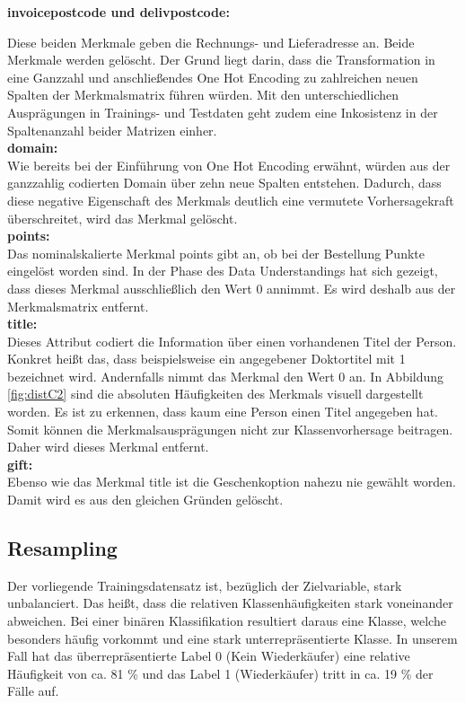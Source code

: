 \textbf{invoicepostcode und delivpostcode:}

Diese beiden Merkmale geben die Rechnungs- und Lieferadresse an. Beide Merkmale werden gelöscht. Der Grund liegt darin, dass die Transformation in eine Ganzzahl und anschließendes One Hot Encoding zu zahlreichen neuen Spalten der Merkmalsmatrix führen würden. Mit den unterschiedlichen Ausprägungen in Trainings- und Testdaten geht zudem eine Inkosistenz in der Spaltenanzahl beider Matrizen einher. \\

\textbf{domain:}\\

Wie bereits bei der Einführung von One Hot Encoding erwähnt, würden aus der ganzzahlig codierten Domain über zehn neue Spalten entstehen. Dadurch, dass diese negative Eigenschaft des Merkmals deutlich eine vermutete Vorhersagekraft überschreitet, wird das Merkmal gelöscht.\\

\textbf{points:}\\

Das nominalskalierte Merkmal points gibt an, ob bei der Bestellung Punkte eingelöst worden sind. In der Phase des Data Understandings hat sich gezeigt, dass dieses Merkmal ausschließlich den Wert 0 annimmt. Es wird deshalb aus der Merkmalsmatrix entfernt.\\

\textbf{title:} \\

Dieses Attribut codiert die Information über einen vorhandenen Titel der Person. Konkret heißt das, dass beispielsweise ein angegebener Doktortitel mit 1 bezeichnet wird. Andernfalls nimmt das Merkmal den Wert 0 an. In Abbildung \ref{fig:distC2} sind die absoluten Häufigkeiten des Merkmals visuell dargestellt worden. Es ist zu erkennen, dass kaum eine Person einen Titel angegeben hat. Somit können die Merkmalsausprägungen nicht zur Klassenvorhersage beitragen. Daher wird dieses Merkmal entfernt.\\

\textbf{gift:}\\

Ebenso wie das Merkmal title ist die Geschenkoption nahezu nie gewählt worden. Damit wird es aus den gleichen Gründen gelöscht.\\

\pagebreak

\subsection{Resampling}
Der vorliegende Trainingsdatensatz ist, bezüglich der Zielvariable, stark unbalanciert. Das heißt, dass die relativen Klassenhäufigkeiten stark voneinander abweichen. Bei einer binären Klassifikation resultiert daraus eine Klasse, welche besonders häufig vorkommt und eine stark unterrepräsentierte Klasse. In unserem Fall hat das überrepräsentierte Label 0 (Kein Wiederkäufer) eine relative Häufigkeit von ca. 81 \% und das Label 1 (Wiederkäufer) tritt in ca. 19 \% der Fälle auf.\\

